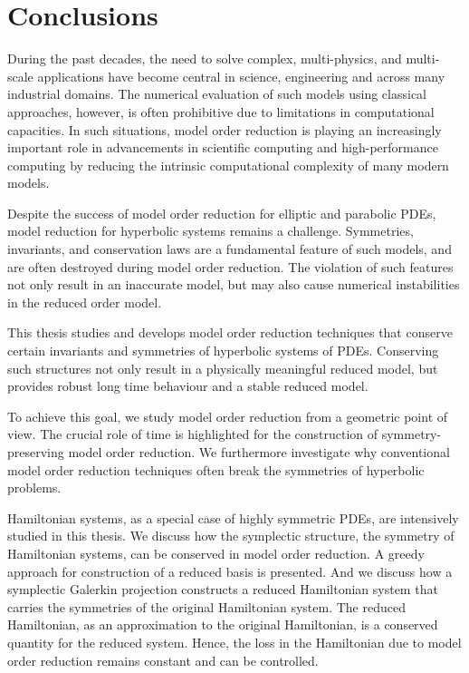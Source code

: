 \chapter{Conclusions} \label{chapter:7}

During the past decades, the need to solve complex, multi-physics, and multi-scale applications have become central in science, engineering and across many industrial domains. The numerical evaluation of such models using classical approaches, however, is often prohibitive due to limitations in computational capacities. In such situations, model order reduction is playing an increasingly important role in advancements in scientific computing and high-performance computing by reducing the intrinsic computational complexity of many modern models.

Despite the success of model order reduction for elliptic and parabolic PDEs, model reduction for hyperbolic systems remains a challenge. Symmetries, invariants, and conservation laws are a fundamental feature of such models, and are often destroyed during model order reduction. The violation of such features not only result in an inaccurate model, but may also cause numerical instabilities in the reduced order model.

This thesis studies and develops model order reduction techniques that conserve certain invariants and symmetries of hyperbolic systems of PDEs. Conserving such structures not only result in a physically meaningful reduced model, but provides robust long time behaviour and a stable reduced model.

To achieve this goal, we study model order reduction from a geometric point of view. The crucial role of time is highlighted for the construction of symmetry-preserving model order reduction. We furthermore investigate why conventional model order reduction techniques often break the symmetries of hyperbolic problems.

Hamiltonian systems, as a special case of highly symmetric PDEs, are intensively studied in this thesis. We discuss how the symplectic structure, the symmetry of Hamiltonian systems, can be conserved in model order reduction. A greedy approach for construction of a reduced basis is presented. And we discuss how a symplectic Galerkin projection constructs a reduced Hamiltonian system that carries the symmetries of the original Hamiltonian system. The reduced Hamiltonian, as an approximation to the original Hamiltonian, is a conserved quantity for the reduced system. Hence, the loss in the Hamiltonian due to model order reduction remains constant and can be controlled.

